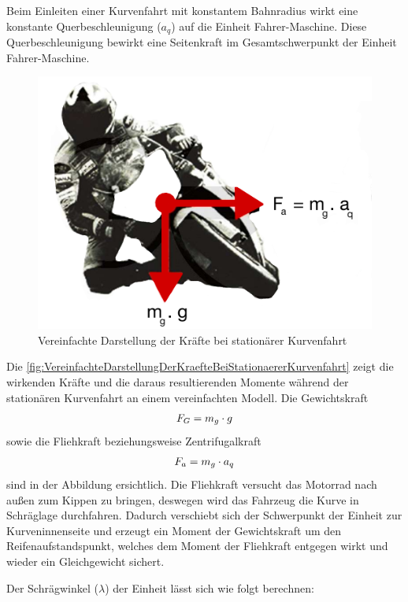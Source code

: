 Beim Einleiten einer Kurvenfahrt mit konstantem Bahnradius wirkt eine konstante Querbeschleunigung ($a_q$) auf die Einheit \glqq Fahrer-Maschine\grqq{}. Diese Querbeschleunigung bewirkt eine Seitenkraft im Gesamtschwerpunkt der Einheit \glqq Fahrer-Maschine\grqq{}. %
\begin{figure}[htpb]
	\centering
	\includegraphics[width=0.6\linewidth]{Bilder/VereinfachteDarstellungDerKraefteBeiStationaererKurvenfahrt2_pdf.pdf}
	\caption{Vereinfachte Darstellung der Kräfte bei stationärer Kurvenfahrt \citep{Haedrich2012}}
	\label{fig:VereinfachteDarstellungDerKraefteBeiStationaererKurvenfahrt}
\end{figure}
Die \autoref{fig:VereinfachteDarstellungDerKraefteBeiStationaererKurvenfahrt} zeigt die wirkenden Kräfte und die daraus resultierenden Momente während der stationären Kurvenfahrt an einem vereinfachten Modell. Die Gewichtskraft 
\begin{align*}
	\centering
	F_G = m_g \cdot g
\end{align*}
sowie die Fliehkraft beziehungsweise Zentrifugalkraft 
\begin{align*}
	\centering
	F_a = m_g \cdot a_q
\end{align*}
sind in der Abbildung ersichtlich. Die Fliehkraft versucht das Motorrad nach außen zum Kippen zu bringen, deswegen wird das Fahrzeug die Kurve in Schräglage durchfahren. Dadurch verschiebt sich der Schwerpunkt der Einheit zur Kurveninnenseite und erzeugt ein Moment der Gewichtskraft um den Reifenaufstandspunkt, welches dem Moment der Fliehkraft entgegen wirkt und wieder ein Gleichgewicht sichert.

Der Schrägwinkel ($\lambda$) der Einheit lässt sich wie folgt berechnen:


